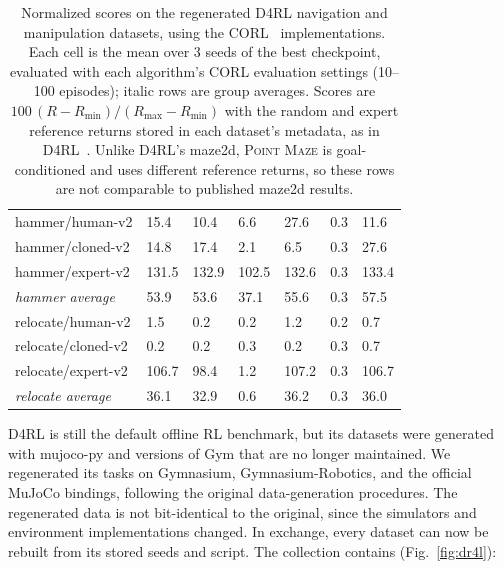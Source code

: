 \documentclass{article}
\begin{document}
\begin{table}[]
\begin{tabular}{@{}lllllll@{}}
hammer/human-v2              & 15.4  & 10.4    & 6.6    & 27.6  & 0.3   & 11.6  \\
hammer/cloned-v2             & 14.8  & 17.4    & 2.1    & 6.5   & 0.3   & 27.6  \\
hammer/expert-v2             & 131.5 & 132.9   & 102.5  & 132.6 & 0.3   & 133.4 \\ \midrule
\textit{hammer average}      & 53.9  & 53.6    & 37.1   & 55.6  & 0.3   & 57.5  \\ \midrule
relocate/human-v2            & 1.5   & 0.2     & 0.2    & 1.2   & 0.2   & 0.7   \\
relocate/cloned-v2           & 0.2   & 0.2     & 0.3    & 0.2   & 0.3   & 0.7   \\
relocate/expert-v2           & 106.7 & 98.4    & 1.2    & 107.2 & 0.3   & 106.7 \\ \midrule
\textit{relocate average}    & 36.1  & 32.9    & 0.6    & 36.2  & 0.3   & 36.0  \\ \bottomrule
\end{tabular}
\caption{Normalized scores on the regenerated D4RL navigation and manipulation datasets, using the CORL~\citep{corl} implementations. Each cell is the mean over 3 seeds of the best checkpoint, evaluated with each algorithm's CORL evaluation settings (10--100 episodes); italic rows are group averages. Scores are $100\,(R-R_{\min})/(R_{\max}-R_{\min})$ with the random and expert reference returns stored in each dataset's metadata, as in D4RL~\citep{d4rl}. Unlike D4RL's maze2d, \textsc{Point Maze} is goal-conditioned and uses different reference returns, so these rows are not comparable to published maze2d results.}
\label{tab:benchmarks_d4rl}
\end{table}
D4RL \citep{d4rl} is still the default offline RL benchmark, but its datasets were generated with mujoco-py and versions of Gym that are no longer maintained. We regenerated its tasks on Gymnasium, Gymnasium-Robotics, and the official MuJoCo bindings, following the original data-generation procedures. The regenerated data is not bit-identical to the original, since the simulators and environment implementations changed. In exchange, every dataset can now be rebuilt from its stored seeds and script. The collection contains (Fig.~\ref{fig:dr4l}):
\end{document}
